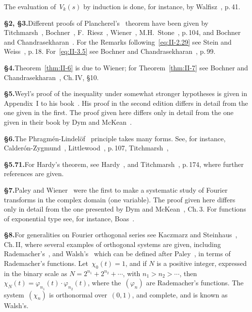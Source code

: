 \noindent The evaluation of~$V_{k}(s)$ by induction is done, for instance, by Walfisz~\cite{walfisz1957}, p.\,41.

\noindent\textbf{§2, §3.}\quad Different proofs of Plancherel's~\cite{plancherel1910} theorem have been given by Titchmarsh~\cite{titchmarsh1939}, Bochner~\cite{bochner1932}, F.~Riesz~\cite{riesz1927}, Wiener~\cite{wiener1933}, M.H.~Stone~\cite{stone1932}, p.\,104, and Bochner and Chandrasekharan~\cite{bochnerchandrasekharan1949}. For the Remarks following~\eqref{eq:II-2.29} see Stein and Weiss~\cite{steinweiss1971}, p.\,18. For~\eqref{eq:II-3.5} see Bochner and Chandrasekharan~\cite{bochnerchandrasekharan1949}, p.\,99.

\noindent\textbf{§4.}\quad Theorem~\ref{thm:II-6} is due to Wiener; for Theorem~\ref{thm:II-7} see Bochner and Chandrasekharan~\cite{bochnerchandrasekharan1949}, Ch.\,IV, §10.

\noindent\textbf{§5.}\quad Weyl's proof of the inequality under somewhat stronger hypotheses is given in Appendix~I to his book~\cite{weyl1928}. His proof in the second edition differs in detail from the one given in the first. The proof given here differs only in detail from the one given in their book by Dym and McKean~\cite{dymmckean1972}.

\noindent\textbf{§6.}\quad The Phragm\'en-Lindel\"of~\cite{phragmenlindelof1908} principle takes many forms. See, for instance, Calder\'on-Zygmund~\cite{calderonzygmund1950}, Littlewood~\cite{littlewood1944}, p.\,107, Titchmarsh~\cite{titchmarsh1939},

\noindent\textbf{§5.71.}\quad For Hardy's theorem, see Hardy~\cite{hardy1933}, and Titchmarsh~\cite{titchmarsh1937}, p.\,174, where further references are given.

\noindent\textbf{§7.}\quad Paley and Wiener~\cite{paleywiener1934} were the first to make a systematic study of Fourier transforms in the complex domain (one variable). The proof given here differs only in detail from the one presented by Dym and McKean~\cite{dymmckean1972}, Ch.\,3. For functions of exponential type see, for instance, Boas~\cite{boas1954}.

\noindent\textbf{§8.}\quad For generalities on Fourier orthogonal series see Kaczmarz and Steinhaus~\cite{kaczmarzsteinhaus1935}, Ch.\,II, where several examples of orthogonal systems are given, including Rademacher's~\cite{rademacher1922}, and Walsh's~\cite{walsh1923} which can be defined after Paley~\cite{paley1932}, in terms of Rademacher's functions. Let~$\chi_0(t)=1$, and if $N$ is a positive integer, expressed in the binary scale as $N=2^{n_1}+2^{n_2}+\cdots$, with $n_1>n_2>\cdots$, then $\chi_N(t)=\varphi_{n_1}(t)\cdot\varphi_{n_2}(t)$, where the~$(\varphi_n)$ are Rademacher's functions. The system~$(\chi_n)$ is orthonormal over~$(0,1)$, and complete, and is known as Walsh's.

